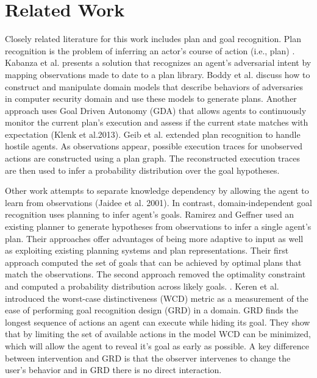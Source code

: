 \documentclass[letterpaper]{article}
\theoremstyle{plain}
\begin{document}
\section{Related Work}
\label{sec:relatedwork}
Closely related literature for this work includes plan and goal recognition. Plan recognition is the problem of inferring an actor's course of action (i.e., plan) \cite{schmidt1978plan,kautz1986generalized}.
Kabanza et al.   presents a solution that recognizes an agent’s adversarial intent by mapping observations made to date to a plan library. Boddy et al.  discuss how to construct and manipulate domain models that describe behaviors of adversaries in computer security domain and use these models to generate plans. Another approach uses Goal Driven Autonomy (GDA) that allows agents to continuously monitor the current plan’s execution and assess if the current state matches with expectation (Klenk et al.2013)\nocite{aha2013gda}. Geib et al.  extended plan recognition to handle hostile agents. As observations appear, possible execution traces for unobserved actions are constructed using a plan graph. The reconstructed execution traces are then used to infer a probability distribution over the goal hypotheses.

Other work attempts to separate knowledge dependency by allowing the agent to learn from observations (Jaidee et al. 2001)\nocite{jaidee2011gda}. In contrast, domain-independent goal recognition uses planning to infer agent’s goals. Ramirez and Geffner  used an existing planner to generate hypotheses from observations to infer a single agent's plan. Their approaches offer advantages of being more adaptive to input as well as exploiting existing planning systems and plan representations. Their first approach computed the set of goals that can be achieved by optimal plans that match the observations. The second approach removed the optimality constraint and computed a probability distribution across likely goals. \cite{ramirez2010probabilistic}. Keren et al.  introduced the worst-case distinctiveness (WCD) metric as a measurement of the ease of performing goal recognition design (GRD) in a domain. GRD finds the longest sequence of actions an agent can execute while hiding its goal. They show that by limiting the set of available actions in the model WCD can be minimized, which will allow the agent to reveal it's goal as early as possible. A key difference between intervention and GRD is that the observer intervenes to change the user's behavior and in GRD there is no direct interaction.
\end{document}
